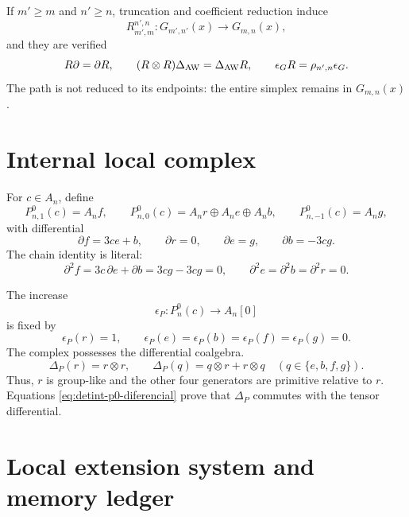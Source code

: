 If \(m'\ge m\) and \(n'\ge n\), truncation and coefficient reduction
induce
\begin{equation}\label{eq:detint-rmn}
 R_{m',m}^{n',n}:G_{m',n'}(x)\longrightarrow G_{m,n}(x),
\end{equation}
and they are verified
\begin{equation}\label{eq:detint-aw-natural}
 R\partial=\partial R,
 \qquad
 (R\otimes R)\Delta_{\rm AW}=\Delta_{\rm AW}R,
 \qquad
 \epsilon_GR=\rho_{n',n}\epsilon_G.
\end{equation}
The path is not reduced to its endpoints: the entire simplex remains in
\(G_{m,n}(x)\).

\section{Internal local complex}

For \(c\in A_n\), define
\begin{equation}\label{eq:detint-p0-grados}
 P^0_{n,1}(c)=A_nf,
 \qquad
 P^0_{n,0}(c)=A_nr\oplus A_ne\oplus A_nb,
 \qquad
 P^0_{n,-1}(c)=A_ng,
\end{equation}
with differential
\begin{equation}\label{eq:detint-p0-diferencial}
 \partial f=3ce+b,
 \qquad
 \partial r=0,
 \qquad
 \partial e=g,
 \qquad
 \partial b=-3cg.
\end{equation}
The chain identity is literal:
\begin{equation}\label{eq:detint-d2}
 \partial^2f=3c\,\partial e+\partial b=3cg-3cg=0,
 \qquad
 \partial^2e=\partial^2b=\partial^2r=0.
\end{equation}

The increase
\begin{equation}\label{eq:detint-epsilon-p}
 \epsilon_P:P_n^0(c)\longrightarrow A_n[0]
\end{equation}
is fixed by
\[
 \epsilon_P(r)=1,
 \qquad
 \epsilon_P(e)=\epsilon_P(b)=\epsilon_P(f)=\epsilon_P(g)=0.
\]
The complex possesses the differential coalgebra.
\begin{equation}\label{eq:detint-coalgebra-p}
 \Delta_P(r)=r\otimes r,
 \qquad
 \Delta_P(q)=q\otimes r+r\otimes q
 \quad(q\in\{e,b,f,g\}).
\end{equation}
Thus, \(r\) is group-like and the other four generators are primitive
relative to \(r\). Equations
\eqref{eq:detint-p0-diferencial} prove that \(\Delta_P\) commutes with the
tensor differential.

\section{Local extension system and memory ledger}

